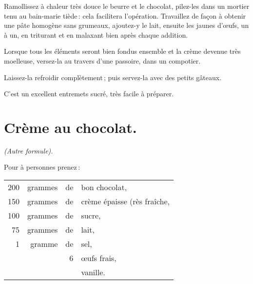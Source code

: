 Ramollissez à chaleur très douce le beurre et le chocolat, pilez-les dans un
mortier tenu au bain-marie tiède : cela facilitera l'opération. Travaillez de
façon à obtenir une pâte homogène sans grumeaux, ajoutez-y le lait, ensuite les
jaunes d'œufs, un à un, en triturant et en malaxant bien après chaque addition.

Lorsque tous les éléments seront bien fondus ensemble et la crème devenue très
moelleuse, versez-la au travers d'une passoire, dans un compotier.

Laissez-la refroidir complètement ; puis servez-la avec des petits gâteaux.

C'est un excellent entremets sucré, très facile à préparer.

\section*{\centering Crème au chocolat.}
{}

\begin{center}
\textit{(Autre formule).}
\end{center}

Pour {\mmm} à {\mmm} personnes prenez :

\footnotesize
\begin{longtable}{rrrp{16em}}
    200 & grammes & de & bon chocolat,                                                                    \\
    150 & grammes & de & crème épaisse (rès fraîche,                                                      \\
    100 & grammes & de & sucre,                                                                           \\
     75 & grammes & de & lait,                                                                            \\
      1 & gramme  & de & sel,                                                                             \\
        &         &  6 & œufs frais,                                                                      \\
        &         &    & vanille.                                                                         \\
\end{longtable}
\normalsize

